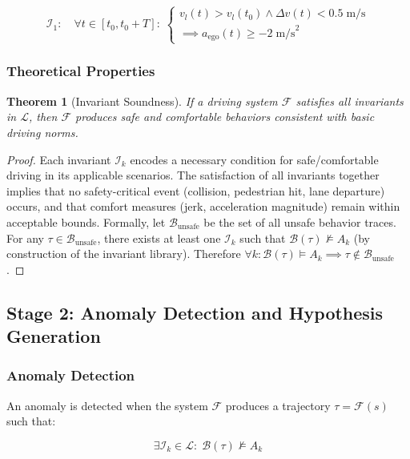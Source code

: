\documentclass[conference]{IEEEtran}
\theoremstyle{plain}
\newtheorem{theorem}{Theorem}[section]
\newcommand{\invlib}{\mathcal{L}}
\newcommand{\sys}{\mathcal{F}}
\newcommand{\beh}{\mathcal{B}}
\begin{document}
\begin{equation}
\mathcal{I}_1: \quad \forall t \in [t_0, t_0+T]: \; 
\begin{cases}
v_l(t) > v_l(t_0) \land \Delta v(t) < 0.5\;\text{m/s} \\
\implies a_{\text{ego}}(t) \geq -2\;\text{m/s}^2
\end{cases}
\label{eq:inv1_formal}
\end{equation}

\subsubsection{Theoretical Properties}

\begin{theorem}[Invariant Soundness]\label{thm:soundness}
If a driving system $\sys$ satisfies all invariants in $\invlib$, then $\sys$ produces safe and comfortable behaviors consistent with basic driving norms.
\end{theorem}

\begin{proof}
Each invariant $\mathcal{I}_k$ encodes a necessary condition for safe/comfortable driving in its applicable scenarios. The satisfaction of all invariants together implies that no safety-critical event (collision, pedestrian hit, lane departure) occurs, and that comfort measures (jerk, acceleration magnitude) remain within acceptable bounds. Formally, let $\mathcal{B}_{\text{unsafe}}$ be the set of all unsafe behavior traces. For any $\tau \in \mathcal{B}_{\text{unsafe}}$, there exists at least one $\mathcal{I}_k$ such that $\beh(\tau) \not\models A_k$ (by construction of the invariant library). Therefore $\forall k: \beh(\tau) \models A_k \implies \tau \notin \mathcal{B}_{\text{unsafe}}$.
\end{proof}

\subsection{Stage 2: Anomaly Detection and Hypothesis Generation}

\subsubsection{Anomaly Detection}

An anomaly is detected when the system $\sys$ produces a trajectory $\tau = \sys(s)$ such that:

\begin{equation}
\exists \mathcal{I}_k \in \invlib: \; \beh(\tau) \not\models A_k
\label{eq:anomaly}
\end{equation}
\end{document}
